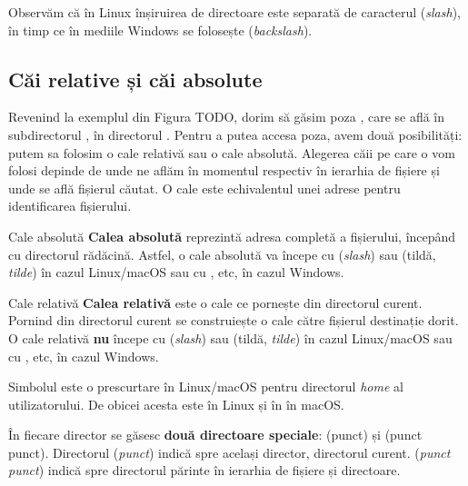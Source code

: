 Observăm că în Linux înșiruirea de directoare este separată de caracterul \file{/}
(\textit{slash}), în timp ce în mediile Windows se folosește \file{\textbackslash{}}
(\textit{backslash}).

\subsection{Căi relative și căi absolute}
\label{sec:file-system-baza-paths}

Revenind la exemplul din Figura TODO, dorim să găsim poza
, care se află în subdirectorul , în
directorul . Pentru a putea accesa poza, avem două posibilități: putem
sa folosim o cale relativă sau o cale absolută. Alegerea căii pe care o vom
folosi depinde de unde ne aflăm în momentul respectiv în ierarhia de fișiere și
unde se află fișierul căutat. O cale este echivalentul unei adrese pentru identificarea fișierului.

\begin{definition}{Cale absolută}
\textbf{Calea absolută} reprezintă adresa completă a fișierului, începând cu
directorul rădăcină. Astfel, o cale absolută va începe cu \file{/} (\textit{slash}) sau
\file{\textasciitilde{}} (tildă, \textit{tilde}) în cazul Linux/macOS sau cu , 
etc, în cazul Windows.
\end{definition}

\begin{definition}{Cale relativă}
\textbf{Calea relativă} este o cale ce pornește din directorul curent. Pornind din directorul curent se construiește o cale către fișierul destinație dorit. O cale relativă \textbf{nu} începe cu \file{/} (\textit{slash}) sau
\file{\textasciitilde{}} (tildă, \textit{tilde}) în cazul Linux/macOS sau cu , 
etc, în cazul Windows.
\end{definition}

\begin{note}
Simbolul \file{\textasciitilde{}} este o prescurtare în Linux/macOS pentru directorul \textit{home} al utilizatorului. De obicei acesta este  în Linux și în  în macOS.
\end{note}

În fiecare director se găsesc \textbf{două directoare speciale}:  (punct) și  (punct punct). Directorul  (\textit{punct}) indică spre același director, directorul curent.  (\textit{punct punct}) indică spre directorul părinte în ierarhia de fișiere și directoare.

